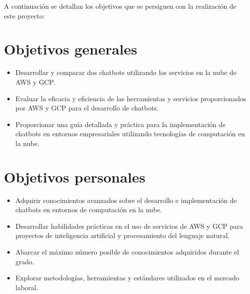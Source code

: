 
A continuación se detallan los objetivos que se persiguen con la realización de este proyecto:


\section{Objetivos generales}\label{objetivos_generales}

\begin{itemize}
\tightlist
\item
Desarrollar y comparar dos chatbots utilizando los servicios en la nube de AWS y GCP.
\item
Evaluar la eficacia y eficiencia de las herramientas y servicios proporcionados por AWS y GCP para el desarrollo de chatbots.
\item
Proporcionar una guía detallada y práctica para la implementación de chatbots en entornos empresariales utilizando tecnologías de computación en la nube.


\end{itemize}

\section{Objetivos personales}\label{objetivos-personales}

\begin{itemize}
\tightlist
\item
Adquirir conocimientos avanzados sobre el desarrollo e implementación de chatbots en entornos de computación en la nube.
\item
Desarrollar habilidades prácticas en el uso de servicios de AWS y GCP para proyectos de inteligencia artificial y procesamiento del lenguaje natural.
\item 
Abarcar el máximo número posible de conocimientos adquiridos durante el grado.
\item 
Explorar metodologías, herramientas y estándares utilizados en el
mercado laboral.
\end{itemize}